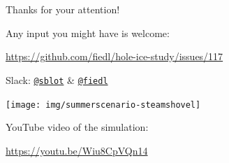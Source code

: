\section{}
\begin{frame}[fragile]{Thanks for your attention!}
  \begin{center}
  Any input you might have is welcome: \\ \vspace{0.3cm}

  \url{https://github.com/fiedl/hole-ice-study/issues/117} \\ \vspace{0.1cm}

  Slack:
  \href{https://icecube-spno.slack.com/messages/U0BJE7Z7T}{\texttt{@sblot}}
  \&
  \href{https://icecube-spno.slack.com/messages/@U092MBFU2}{\texttt{@fiedl}}

  \vspace{1.5cm}

  \texttt{[image: img/summerscenario-steamshovel]}

  YouTube video of the simulation:

  \url{https://youtu.be/Wiu8CpVQn14}

  \end{center}
\end{frame}